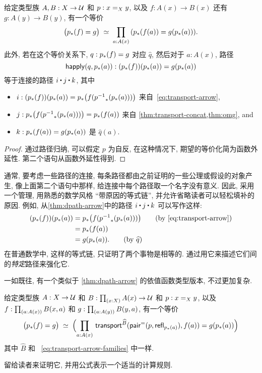 \begin{lem}\label{thm:dpath-arrow}
  给定类型族 $A,B:X\to\type$ 和 $p:\id[X]xy$, 以及 $f:A(x)\to B(x)$ 还有 $g:A(y)\to B(y)$, 有一个等价
  \[ \eqvspaced{ \big(\trans{p}{f} = {g}\big) } { \prd{a:A(x)}  (\trans{p}{f(a)} = g(\trans{p}{a})) }. \]
  此外, 若在这个等价关系下, $q:\trans{p}{f} = {g}$ 对应 $\widehat q$, 然后对于 $a:A(x)$, 路径
  \[ \happly(q,\trans p a) : (\trans p f)(\trans p a) = g(\trans p a)\]
  等于连接的路径 $i\ct j\ct k$, 其中
  \begin{itemize}
  \item $i:(\trans p f)(\trans p a) = \trans p {f (\trans {\opp p}{\trans p a})}$ 来自~\eqref{eq:transport-arrow},
  \item $j:\trans p {f (\trans {\opp p}{\trans p a})} = \trans p {f(a)}$ 来自 \cref{thm:transport-concat,thm:omg}, and
  \item $k:\trans p {f(a)}= g(\trans p a)$ 是 $\widehat{q}(a)$.
  \end{itemize}
\end{lem}
\begin{proof}
  通过路径归纳, 可以假定 $p$ 为自反, 在这种情况下, 期望的等价化简为函数外延性.
  第二个语句从函数外延性得到.
\end{proof}

通常, 要考虑一些路径的连接, 每条路径都由之前证明的一些公理或假设的对象产生, 像上面第二个语句中那样, 给连接中每个路径取一个名字没有意义.
因此, 采用一个管理, 用熟悉的数学风格 ``带原因的等式链'', 并允许省略读者可以轻松填补的原因.
例如, 从\cref{thm:dpath-arrow}中的路径 $i\ct j\ct k$ 可以写作这样:
  \begin{align*}
    (\trans p f)(\trans p a)
    &= \trans p {f (\trans {\opp p}{\trans p a})}
    \tag{by~\eqref{eq:transport-arrow}}\\
    &= \trans p {f(a)}\\
    &= g(\trans p a).
    \tag{by $\widehat{q}$}
  \end{align*}
在普通数学中, 这样的等式链, 只证明了两个事物是相等的.
通过用它来描述它们间的\emph{特定}路径来强化它.

一如既往, 有一个类似于 \cref{thm:dpath-arrow} 的依值函数类型版本, 不过更加复杂.

\begin{lem}\label{thm:dpath-forall}
  给定类型族 $A:X\to\type$ 和 $B:\prd{x:X} A(x)\to\type$ 和 $p:\id[X]xy$, 以及 $f:\prd{a:A(x)} B(x,a)$ 和 $g:\prd{a:A(y)} B(y,a)$, 有一个等价
  \[ \eqvspaced{ \big(\trans{p}{f} = {g}\big) } { \Parens{\prd{a:A(x)}  \transfib{\widehat{B}}{\pairpath(p,\refl{\trans pa})}{f(a)} = g(\trans{p}{a}) } } \]
  其中 $\widehat{B}$ 和 ~\eqref{eq:transport-arrow-families} 中一样.
\end{lem}

留给读者来证明它, 并用公式表示一个适当的计算规则.

%
%
%